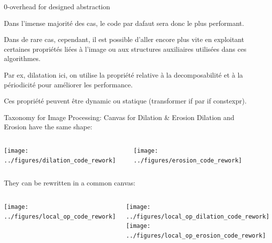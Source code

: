 \documentclass[12pt,aspectratio=169]{beamer}
\begin{document}
\begin{frame}[fragile]{0-overhead for designed abstraction}
{    Dans l'imense majorité des cas, le code par dafaut sera donc le plus performant.

    Dans de rare cas, cependant, il est possible d'aller encore plus vite en exploitant certaines propriétés liées à l'image ou aux structures auxiliaires utilisées dans ces algorithmes.

    Par ex, dilatation ici, on utilise la propriété relative à la decomposabilité et à la périodicité pour améliorer les performance.

    Ces propriété peuvent être dynamic ou statique (transformer if par if constexpr).
  }
\end{frame}

\begin{frame}[fragile]{Taxonomy for Image Processing: Canvas for Dilation \& Erosion}
  Dilation and Erosion have the same shape:
  \begin{columns}[T,onlytextwidth]
    \texttt{[image: ../figures/dilation\_code\_rework]}

    \texttt{[image: ../figures/erosion\_code\_rework]}
  \end{columns}
  \bigskip
  They can be rewritten in a common canvas:
  \begin{columns}[T,onlytextwidth]
    \texttt{[image: ../figures/local\_op\_code\_rework]}

    \texttt{[image: ../figures/local\_op\_dilation\_code\_rework]}
    \texttt{[image: ../figures/local\_op\_erosion\_code\_rework]}
  \end{columns}
  \pdfcomment[icon=Note]{   }
  \pdfcomment[icon=Note]{   }
  \pdfcomment[icon=Note]{   }
\end{frame}
\end{document}
